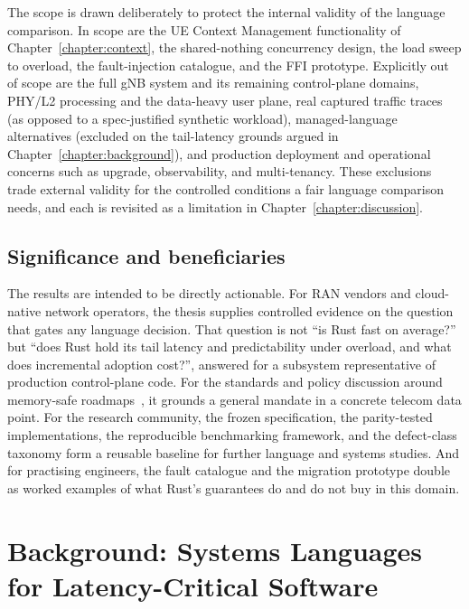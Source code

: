 \documentclass[english,twoside,openright,a4paper,censored,csm,software-track-2020]{HYthesisML}
\begin{document}
The scope is drawn deliberately to protect the internal validity of the language comparison. In
scope are the UE Context Management functionality of Chapter~\ref{chapter:context}, the
shared-nothing concurrency design, the load sweep to overload, the fault-injection catalogue,
and the FFI prototype. Explicitly out of scope are the full gNB system and its remaining
control-plane domains, PHY/L2 processing and the data-heavy user plane, real captured traffic
traces (as opposed to a spec-justified synthetic workload), managed-language alternatives
(excluded on the tail-latency grounds argued in Chapter~\ref{chapter:background}), and
production deployment and operational concerns such as upgrade, observability, and
multi-tenancy. These exclusions trade external validity for the controlled conditions a fair
language comparison needs, and each is revisited as a limitation in
Chapter~\ref{chapter:discussion}.

\section{Significance and beneficiaries}
The results are intended to be directly actionable. For RAN vendors and cloud-native network
operators, the thesis supplies controlled evidence on the question that gates any language
decision. That question is not ``is Rust fast on average?'' but ``does Rust hold its tail latency and
predictability under overload, and what does incremental adoption cost?'', answered for a subsystem
representative of production control-plane code. For the standards and policy discussion around
memory-safe roadmaps~\cite{cisa2023memorysafe,oncd2024building}, it grounds a general mandate in
a concrete telecom data point. For the research community, the frozen specification, the
parity-tested implementations, the reproducible benchmarking framework, and the defect-class
taxonomy form a reusable baseline for further language and systems studies. And for practising
engineers, the fault catalogue and the migration prototype double as worked examples of what
Rust's guarantees do and do not buy in this domain.

\chapter{Background: Systems Languages for Latency-Critical Software\label{chapter:background}}
\end{document}
